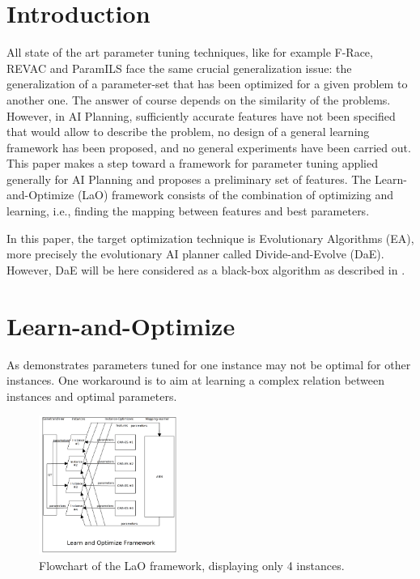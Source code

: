 \documentclass{MYsig-alternate}
\begin{document}



\section{Introduction}

All state of the art parameter tuning techniques, like for example F-Race, REVAC and ParamILS \cite{Montero:2010} face the same crucial generalization issue: the generalization of a parameter-set that has been optimized for a given problem to another one. The answer of course depends on the similarity of the problems. However, in AI Planning, sufficiently accurate features have not been specified that would allow to describe the problem, no design of a general learning framework has been proposed, and no general experiments have been carried out. This paper makes a step toward a framework for parameter tuning applied generally for AI Planning and proposes a preliminary set of features. The Learn-and-Optimize (LaO) framework consists of the combination of optimizing and learning, i.e., finding the mapping between features and best parameters.

In this paper, the target optimization technique is Evolutionary Algorithms (EA), more precisely the evolutionary AI planner called Divide-and-Evolve (DaE). However, DaE will be here considered as a black-box algorithm as described in \cite{BibEvoCop:2010}. 

\section{Learn-and-Optimize}
\label{section:LaO}

As \cite{BibGECCO:2010} demonstrates parameters tuned for one instance may not be optimal for other instances. One workaround is to aim at learning a complex relation between instances and optimal parameters.

\begin{figure}[h!]
  \centering
    \includegraphics[width=0.4\textwidth]{lao.png}
  \caption{Flowchart of the LaO framework, displaying only 4 instances.}
\label{figure:laoflowchart}
\end{figure}
\end{document}
